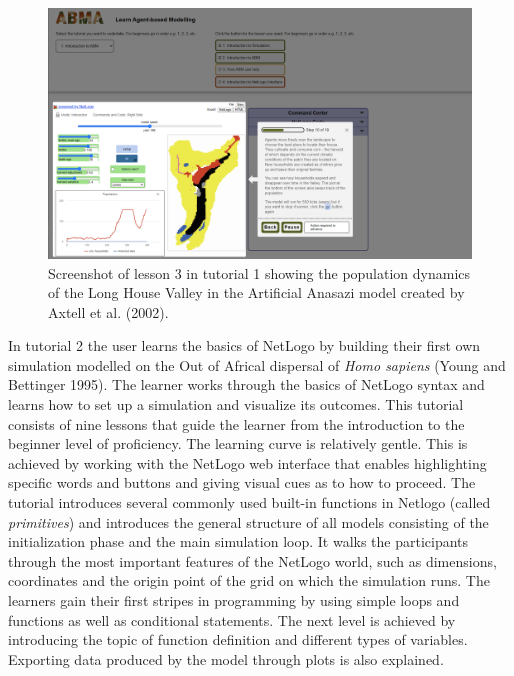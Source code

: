 \documentclass[
]{article}
\begin{document}
\begin{figure}
\includegraphics[width=1\linewidth]{paper_files/ScreenshotABMAtutorial1lesson3} \caption{Screenshot of lesson 3 in tutorial 1 showing the population dynamics of the Long House Valley in the Artificial Anasazi model created by Axtell et al. (2002).}\label{fig:screenshot-lesson-3}
\end{figure}

In tutorial 2 the user learns the basics of NetLogo by building their first own simulation modelled on the Out of Africal dispersal of \emph{Homo sapiens} (Young and Bettinger 1995). The learner works through the basics of NetLogo syntax and learns how to set up a simulation and visualize its outcomes. This tutorial consists of nine lessons that guide the learner from the introduction to the beginner level of proficiency. The learning curve is relatively gentle. This is achieved by working with the NetLogo web interface that enables highlighting specific words and buttons and giving visual cues as to how to proceed. The tutorial introduces several commonly used built-in functions in Netlogo (called \emph{primitives}) and introduces the general structure of all models consisting of the initialization phase and the main simulation loop. It walks the participants through the most important features of the NetLogo world, such as dimensions, coordinates and the origin point of the grid on which the simulation runs. The learners gain their first stripes in programming by using simple loops and functions as well as conditional statements. The next level is achieved by introducing the topic of function definition and different types of variables. Exporting data produced by the model through plots is also explained.
\end{document}
